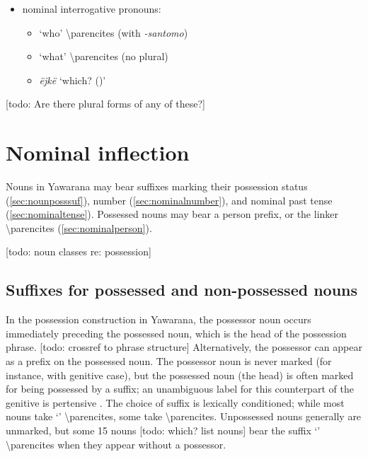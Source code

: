 \documentclass{memoir}
\begin{document}
\begin{itemize}
\tightlist
\item
  nominal interrogative pronouns:

  \begin{itemize}
  \tightlist
  \item
     `who' \textbackslash parencites (with \emph{-santomo})
  \item
     `what' \textbackslash parencites (no plural)
  \item
    \emph{ëjkë} `which? ()'
  \end{itemize}
\end{itemize}

{[}todo: Are there plural forms of any of these?{]}

\section{\texorpdfstring{Nominal inflection
\label{sec:nouninfl}}{Nominal inflection }}

Nouns in Yawarana may bear suffixes marking their possession status
(\cref{sec:nounposssuf}), number (\cref{sec:nominalnumber}), and nominal
past tense (\cref{sec:nominaltense}). Possessed nouns may bear a person
prefix, or the linker  \textbackslash parencites
(\cref{sec:nominalperson}).

{[}todo: noun classes re: possession{]}

\subsection{\texorpdfstring{Suffixes for possessed and non-possessed
nouns
\label{sec:nounposssuf}}{Suffixes for possessed and non-possessed nouns }}

In the possession construction in Yawarana, the possessor noun occurs
immediately preceding the possessed noun, which is the head of the
possession phrase. {[}todo: crossref to phrase structure{]}
Alternatively, the possessor can appear as a prefix on the possessed
noun. The possessor noun is never marked (for instance, with genitive
case), but the possessed noun (the head) is often marked for being
possessed by a suffix; an unambiguous label for this counterpart of the
genitive is pertensive \parencites{dixon2010basic}. The choice of suffix
is lexically conditioned; while most nouns take  `'
\textbackslash parencites, some take 
\textbackslash parencites. Unpossessed nouns generally are unmarked, but
some 15 nouns {[}todo: which? list nouns{]} bear the suffix 
`' \textbackslash parencites when they appear without a
possessor.
\end{document}
